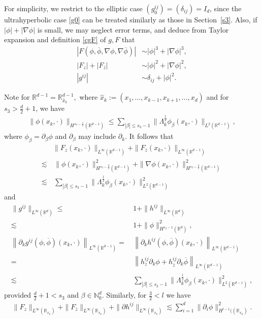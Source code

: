 \documentclass[10pt,twoside,a4paper]{article}
\numberwithin{equation}{section}\allowdisplaybreaks
\def\leq{\leqslant}
\begin{document}
For simplicity, we restrict to the elliptic case $  \left(g_0^{ij}\right) = \left(	\delta_{i j}\right)  =I_d  $, since the ultrahyperbolic case \eqref{g0} can be treated similarly as those in Section~\ref{s3}. Also,  if $ |\phi|+ |\nabla\phi| $ is small, we may neglect error terms, and deduce from Taylor expansion and definition  \eqref{cgF} of $ g, F $ that
\begin{align*}
	\left| F\left(\phi,\overline{\phi},\nabla\phi, \nabla \overline{\phi}\right)\right|& \sim |\phi|^3+|\nabla\phi|^3,\\
	\left| F_z\right|+\left| F_{\overline{z}}\right|& \sim |\phi|^2+|\nabla\phi|^2,\\
|	g^{ij}| &\sim  \delta_{ij}+|\phi|^2. 
\end{align*}
  
Note for $\mathbb{R}^{d-1}= \mathbb{R}^{d-1}_{\widehat{x}_k},$  where $ \hat{x}_k:= (x_1,\dots,x_{k-1},x_{k+1},\dots,x_d ) $ and for $ s_3>\frac d2+1 $, we have
\begin{align*}
	\| \phi(x_k,\cdot)\|_{H^{s_3-\frac 12}(\mathbb{R}^{d-1})}\leq	\sum_{|\beta|\leq s_3-1}  \| \Lambda_k^{\frac 12}\phi_{\beta}(x_k,\cdot)\|_{L^2(\mathbb{R}^{d-1})},
\end{align*}
where $ \phi_{\beta}=\partial_{\beta} \phi  $ and $ \partial_{\beta} $  may include $ \partial_k $.
It follows that
\begin{align} \label{cF}
	&\|F_z(x_k,\cdot)\|_{L^\infty(\mathbb{R}^{d-1})} +\|F_{\overline{z}}(x_k,\cdot)\|_{L^\infty(\mathbb{R}^{d-1})}\nonumber\\
	\lesssim &\,\|\phi(x_k,\cdot)\|_{H^{s_3-\frac 32}(\mathbb{R}^{d-1})}^2+\|\nabla\phi(x_k,\cdot)\|_{H^{s_3-\frac 32}(\mathbb{R}^{d-1})}^2 \\
	\lesssim &\,\sum_{|\beta|\leq s_3-1}  \| \Lambda_k^{\frac 12}\phi_{\beta}(x_k,\cdot)\|_{L^2(\mathbb{R}^{d-1})}^2 \nonumber
\end{align}
and
\begin{align} \label{cg}
	\|g^{ij}\|_{L^\infty(\mathbb{R}^d)}\leq&\, 1+\|h^{ij}\|_{L^\infty(\mathbb{R}^d)}\\
	\lesssim &\,1+\|\phi\|_{H^{s_3-1}(\mathbb{R}^d)}^2,\nonumber\\
	\left\|	\partial_k g^{ij} (\phi,\overline{\phi})(x_k,\cdot)\right\|_{L^\infty(\mathbb{R}^{d-1})}=&\,\left\|	\partial_k h^{ij} (\phi,\overline{\phi})(x_k,\cdot)\right\|_{L^\infty(\mathbb{R}^{d-1})}\label{cpg}\\
	=&\,\left\|  h^{ij}_z \partial_k \phi+  h^{ij}_{\overline{z}} \partial_k \overline{\phi} \right\|_{L^\infty(\mathbb{R}^{d-1})}\nonumber\\
	\lesssim &\,\sum_{|\beta|\leq s_3-1}  \| \Lambda_k^{\frac 12}\phi_{\beta}(x_k,\cdot)\|_{L^2(\mathbb{R}^{d-1})}^2,\nonumber
\end{align}
provided  $\frac{d}{2}+1<  s_3 $ and $\beta \in \mathbb{N}^d_0$. Similarly, for $ \frac 32 <l $ we have
\begin{align*} 
	\|F_z\|_{L^\infty(\mathbb{R}_{x_k})}+\|F_{\overline{z}}\|_{L^\infty(\mathbb{R}_{x_k})}+\|\partial h^{ij}\|_{L^\infty(\mathbb{R}_{x_k})} \lesssim   \sum_{i=1}^d\|\partial_i \phi \|_{H^{l-1}((\mathbb{R}_{x_k})}^2.
\end{align*}
\end{document}
